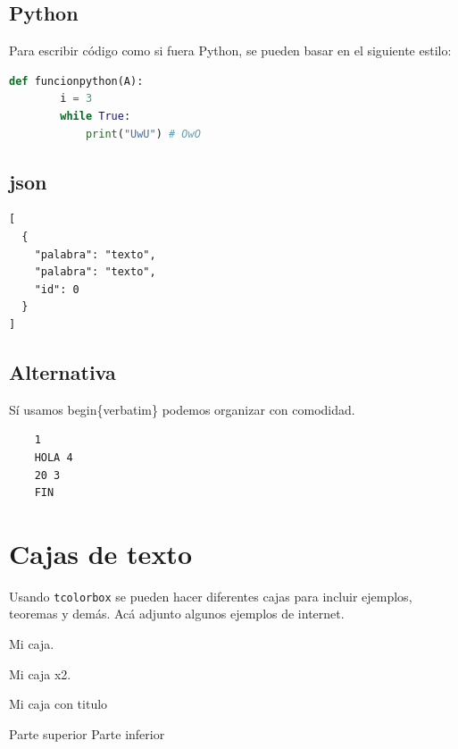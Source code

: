 \subsection{Python}
Para escribir código como si fuera Python, se pueden basar en el siguiente estilo:
\begin{lstlisting}[language=Python, style=stylepython]
    def funcionpython(A):
        i = 3
        while True:
            print("UwU") # OwO
\end{lstlisting}

\subsection{json}
\begin{verbatim} 
[
  {
    "palabra": "texto",
    "palabra": "texto",
    "id": 0
  }
]
\end{verbatim}

\subsection{Alternativa}
Sí usamos begin\{verbatim\} podemos organizar con comodidad.
\begin{verbatim}
    1
    HOLA 4
    20 3
    FIN
\end{verbatim}


\newpage
\section{Cajas de texto}
Usando \texttt{tcolorbox} se pueden hacer diferentes cajas para incluir ejemplos, teoremas y demás. Acá adjunto algunos ejemplos de internet.

\begin{tcolorbox}
  Mi caja.
\end{tcolorbox}

\begin{tcolorbox}[colback=red!5!white,colframe=red!75!black]
  Mi caja x2.
\end{tcolorbox}

\begin{tcolorbox}[colback=blue!5!white,colframe=blue!75!black,title=Mi titulo]
  Mi caja con titulo
\end{tcolorbox}

\begin{tcolorbox}[colback=green!5!white,colframe=green!75!black]
  Parte superior
  \tcblower
  Parte inferior
\end{tcolorbox}

